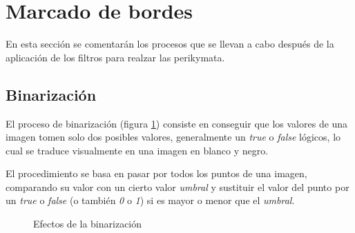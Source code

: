 \section{Marcado de bordes}
En esta sección se comentarán los procesos que se llevan a cabo después de la aplicación de los filtros para realzar las perikymata.

\subsection{Binarización}
\label{Binarizacion}
El proceso de binarización (figura \ref{fig:Binarize}) consiste en conseguir que los valores de una imagen tomen solo dos posibles valores, generalmente un \textit{true} o \textit{false} lógicos, lo cual se traduce visualmente en una imagen en blanco y negro.

El procedimiento se basa en pasar por todos los puntos de una imagen, comparando su valor con un cierto valor \textit{umbral} y sustituir el valor del punto por un \textit{true} o \textit{false} (o también \textit{0} o \textit{1}) si es mayor o menor que el \textit{umbral}.

\begin{figure}[h]
\centering
{}
\caption{Efectos de la binarización}
\label{fig:Binarize}
\end{figure}
\FloatBarrier

